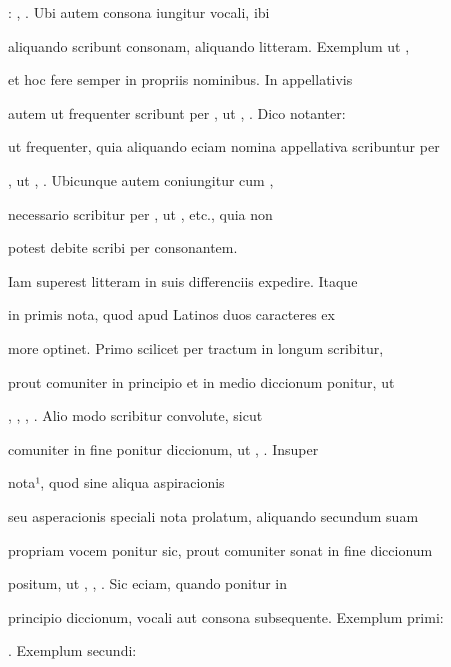 : , . Ubi autem  consona iungitur  vocali, ibi

aliquando scribunt  consonam, aliquando  litteram. Exemplum ut ,

 et hoc fere semper in propriis nominibus. In appellativis

autem ut frequenter scribunt per , ut , . Dico notanter:

ut frequenter, quia aliquando eciam nomina appellativa scribuntur per

, ut , . Ubicunque autem  coniungitur cum ,

necessario scribitur per , ut ,  etc., quia non


potest debite scribi per  consonantem.


\indentK Iam superest  litteram in suis differenciis expedire. Itaque

\fulllines

in primis nota, quod  apud Latinos duos caracteres ex

more optinet. Primo scilicet per tractum in longum scribitur,

prout comuniter in principio et in medio diccionum ponitur, ut

, , , . Alio modo scribitur convolute, sicut

comuniter in fine ponitur diccionum, ut , . Insuper

nota¹, quod  sine aliqua aspiracionis

seu asperacionis speciali nota prolatum, aliquando secundum suam

propriam vocem ponitur sic, prout comuniter sonat in fine diccionum

positum, ut , , . Sic eciam, quando ponitur in

principio diccionum, vocali aut consona subsequente. Exemplum primi: 

    . Exemplum secundi: 

